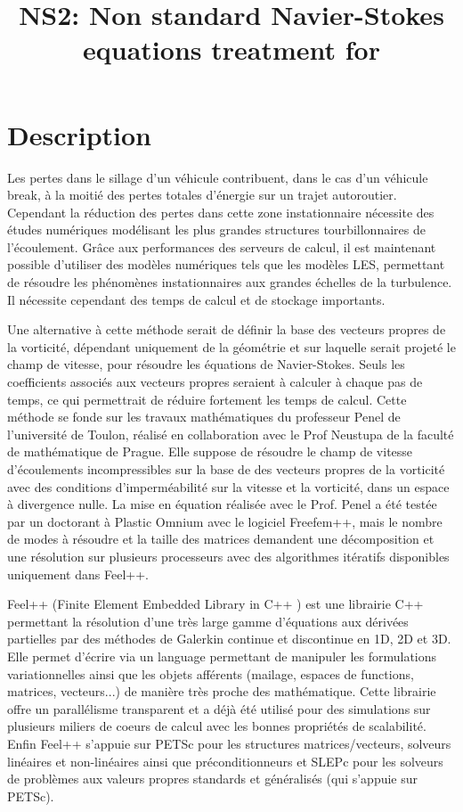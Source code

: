 \documentclass{article}
\title{NS2: Non standard Navier-Stokes equations treatment for }
\begin{document}
\section{Description}
\label{sec:description}

Les pertes dans le sillage d’un véhicule contribuent, dans le cas d’un véhicule
break, à la moitié des pertes totales d’énergie sur un trajet
autoroutier. Cependant la réduction des pertes dans cette zone instationnaire
nécessite des études numériques modélisant les plus grandes structures
tourbillonnaires de l’écoulement. Grâce aux performances des serveurs de calcul,
il est maintenant possible d’utiliser des modèles numériques tels que les
modèles LES, permettant de résoudre les phénomènes instationnaires aux grandes
échelles de la turbulence. Il nécessite cependant des temps de calcul et de
stockage importants.

Une alternative à cette méthode serait de définir la base des vecteurs propres
de la vorticité, dépendant uniquement de la géométrie et sur laquelle serait
projeté le champ de vitesse, pour résoudre les équations de Navier-Stokes. Seuls
les coefficients associés aux vecteurs propres seraient à calculer à chaque pas
de temps, ce qui permettrait de réduire fortement les temps de calcul. Cette
méthode se fonde sur les travaux mathématiques du professeur Penel de
l’université de Toulon, réalisé en collaboration avec le Prof Neustupa de la
faculté de mathématique de Prague. Elle suppose de résoudre le champ de vitesse
d’écoulements incompressibles sur la base de des vecteurs propres de la
vorticité avec des conditions d’imperméabilité sur la vitesse et la vorticité,
dans un espace à divergence nulle. La mise en équation réalisée avec le
Prof. Penel a été testée par un doctorant à Plastic Omnium avec le logiciel
Freefem++, mais le nombre de modes à résoudre et la taille des matrices
demandent une décomposition et une résolution sur plusieurs processeurs avec des
algorithmes itératifs disponibles uniquement dans Feel++.

Feel++ (Finite Element Embedded Library in C++ ) est une librairie C++
permettant la résolution d'une très large gamme d'équations aux dérivées
partielles par des méthodes de Galerkin continue et discontinue en 1D, 2D et
3D. Elle permet d'écrire via un language permettant de manipuler les
formulations variationnelles ainsi que les objets afférents (mailage, espaces de
functions, matrices, vecteurs...) de manière très proche des mathématique. Cette
librairie offre un parallélisme transparent et a déjà été utilisé pour des
simulations sur plusieurs miliers de coeurs de calcul avec les bonnes propriétés
de scalabilité. Enfin Feel++ s'appuie sur PETSc pour les structures
matrices/vecteurs, solveurs linéaires et non-linéaires ainsi que
préconditionneurs et SLEPc pour les solveurs de problèmes aux valeurs propres
standards et généralisés (qui s'appuie sur PETSc).
\end{document}
